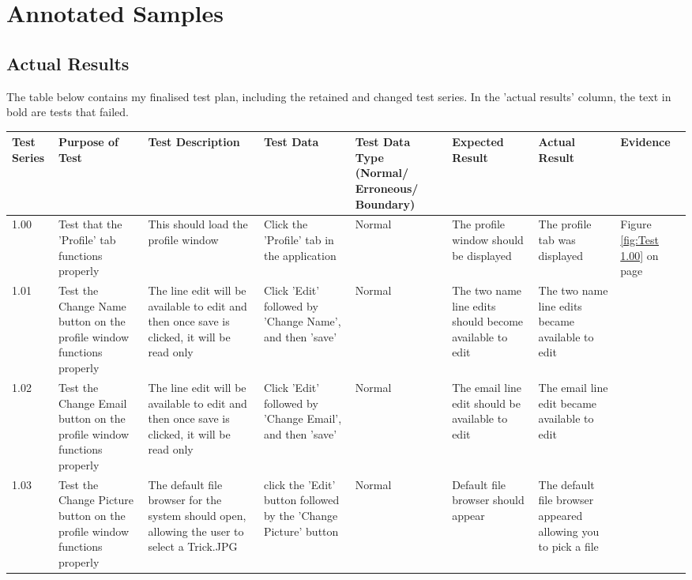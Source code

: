 \section{Annotated Samples}

\subsection{Actual Results} %

The table below contains my finalised test plan, including the retained and changed test series. In the 'actual results' column, the text in bold are tests that failed.

\begin{landscape}
\begin{center}
    \begin{longtable}{|p{1.5cm}|p{2.5cm}|p{2.5cm}|p{2cm}|p{2cm}|p{2cm}|p{2cm}|p{2cm}|}
        \hline
        \textbf{Test Series} & \textbf{Purpose of Test} & \textbf{Test Description} & \textbf{Test Data} & \textbf{Test Data Type (Normal/ Erroneous/ Boundary)} & \textbf{Expected Result} & \textbf{Actual Result} & \textbf{Evidence}\\ \hline
1.00 & Test that the 'Profile' tab functions properly & This should load the profile window & Click the 'Profile' tab in the application & Normal & The profile window should be displayed & The profile tab was displayed & Figure \ref{fig:Test 1.00} on page \pageref{fig:Test 1.00} \\ \hline

1.01 & Test the Change Name button on the profile window functions properly & The line edit will be available to edit and then once save is clicked, it will be read only  &  Click 'Edit' followed by 'Change Name', and then 'save' & Normal & The two name line edits should become available to edit & The two name line edits became available to edit & \\ \hline

1.02 & Test the Change Email button on the profile window functions properly & The line edit will be available to edit and then once save is clicked, it will be read only & Click 'Edit' followed by 'Change Email', and then 'save' & Normal &  The email line edit should be available to edit & The email line edit became available to edit &  \\ \hline

1.03 & Test the Change Picture button on the profile window functions properly &  The default file browser for the system should open, allowing the user to select a Trick.JPG & click the 'Edit' button followed by the 'Change Picture' button & Normal & Default file browser should appear & The default file browser appeared allowing you to pick a file &\\ \hline


\end{longtable}
\end{center}
\end{landscape}

